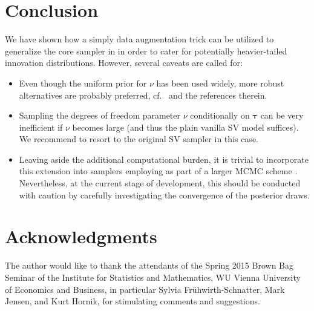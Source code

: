 \documentclass[article, nojss]{jss}
\begin{document}
\section{Conclusion}
We have shown how a simply data augmentation trick can be utilized to generalize the core sampler in  in order to cater for potentially heavier-tailed innovation distributions. However, several caveats are called for:
\begin{itemize}
 \item Even though the uniform prior for $\nu$ has been used widely, more robust alternatives are probably preferred, cf.\ \cite{fru-pay:bay} and the references therein.
 \item Sampling the degrees of freedom parameter $\nu$ conditionally on $\bm{\tau}$ can be very inefficient if $\nu$ becomes large (and thus the plain vanilla SV model suffices). We recommend to resort to the original SV sampler in this case.
 \item Leaving aside the additional computational burden, it is trivial to incorporate this extension into samplers employing  as part of a larger MCMC scheme \citep[e.g.][]{hub:den, kas-etal:ana, dov-etal:doe}. Nevertheless, at the current stage of development, this should be conducted with caution by carefully investigating the convergence of the posterior draws.
\end{itemize}

\section*{Acknowledgments}
The author would like to thank the attendants of the Spring 2015 Brown Bag Seminar of the Institute for Statistics and Mathematics, WU Vienna University of Economics and Business, in particular Sylvia Fr\"{u}hwirth-Schnatter, Mark Jensen, and Kurt Hornik, for stimulating comments and suggestions.


\end{document}
